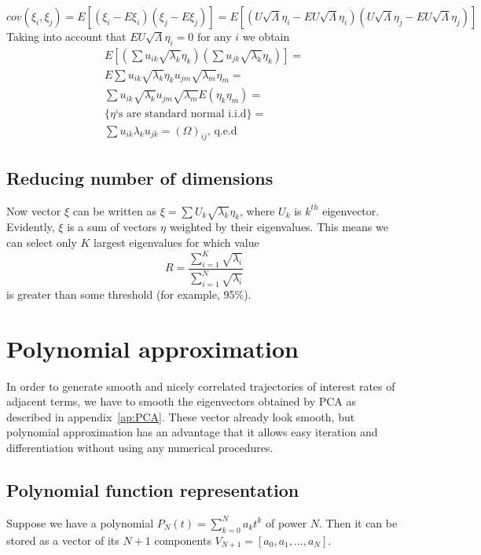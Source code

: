 \documentclass[11pt]{article} %
\newcommand{\euley}{U\sqrt{\Lambda}\eta}
\newcommand{\uley}[1]{\euley_#1}
\begin{document}
\begin{equation}
cov(\xi_i,\xi_j) = 
E\left[(\xi_i-E\xi_i)(\xi_j-E\xi_j)\right] =
E\left[\left(\uley{i}-E\uley{i}\right)\left(\uley{j}-E\uley{j}\right)\right]  \nonumber 
\end{equation}
Taking into account that $E\uley{i} = 0 \text{ for any } i$ we obtain
\begin{multline}
E\left[\left(\sum{u_{ik}\sqrt{\lambda_k}\eta_k}\right)\left(\sum{u_{jk}\sqrt{\lambda_k}\eta_k}\right)\right] = \\
E\sum{u_{ik}\sqrt{\lambda_k}\eta_k u_{jm}\sqrt{\lambda_m}\eta_m} = \\
\sum{u_{ik}\sqrt{\lambda_k}u_{jm}\sqrt{\lambda_m}E(\eta_k\eta_m)} = \\
 \{\eta\text{`s are standard normal i.i.d}\} = \\
\sum{u_{ik}\lambda_ku_{jk}} = \left(\Omega\right)_{ij} \text{, q.e.d}
\end{multline}

\subsection{Reducing number of dimensions}
Now vector $\xi$ can be written as  $\xi = \sum{U_k\sqrt{\lambda_k}\eta_k}$, where $U_k$ is $k^{th}$ eigenvector. Evidently, $\xi$ is a sum of vectors $\eta$ weighted by their eigenvalues. This means we can select only $K$ largest eigenvalues for which value
\begin{equation}
R = \frac{\sum_{i=1}^K{\sqrt{\lambda_i}}}{\sum_{i=1}^N{\sqrt{\lambda_i}}}
\end{equation} 
is greater than some threshold (for example, 95\%).

\section{Polynomial approximation}
\label{ap:Polynom}

In order to generate smooth and nicely correlated trajectories of interest rates of adjacent terms, we have to smooth the eigenvectors obtained by PCA as described in appendix~\ref{ap:PCA}. These vector already look smooth, but polynomial approximation has an advantage that it allows easy iteration and differentiation without using any numerical procedures. 
\subsection{Polynomial function representation}
Suppose we have a polynomial $P_N(t) = \sum_{k=0}^N a_k t^k$ of power $N$. Then it can be stored as a vector of its $N+1$ components $V_{N+1} = [a_0, a_1, ..., a_N]$.
\end{document}
